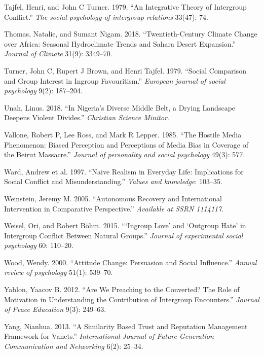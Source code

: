 \documentclass[11pt]{article}
\begin{document}
\leavevmode\hypertarget{ref-tajfel1979integrative}{}%
Tajfel, Henri, and John C Turner. 1979. ``An Integrative Theory of
Intergroup Conflict.'' \emph{The social psychology of intergroup
relations} 33(47): 74.

\leavevmode\hypertarget{ref-thomas2018sahara}{}%
Thomas, Natalie, and Sumant Nigam. 2018. ``Twentieth-Century Climate
Change over Africa: Seasonal Hydroclimate Trends and Sahara Desert
Expansion.'' \emph{Journal of Climate} 31(9): 3349--70.

\leavevmode\hypertarget{ref-turner1979social}{}%
Turner, John C, Rupert J Brown, and Henri Tajfel. 1979. ``Social
Comparison and Group Interest in Ingroup Favouritism.'' \emph{European
journal of social psychology} 9(2): 187--204.

\leavevmode\hypertarget{ref-unah2018nigeria}{}%
Unah, Linus. 2018. ``In Nigeria's Diverse Middle Belt, a Drying
Landscape Deepens Violent Divides.'' \emph{Christian Science Minitor}.

\leavevmode\hypertarget{ref-vallone1985hostileMedia}{}%
Vallone, Robert P, Lee Ross, and Mark R Lepper. 1985. ``The Hostile
Media Phenomenon: Biased Perception and Perceptions of Media Bias in
Coverage of the Beirut Massacre.'' \emph{Journal of personality and
social psychology} 49(3): 577.

\leavevmode\hypertarget{ref-ward1997naive}{}%
Ward, Andrew et al. 1997. ``Naive Realism in Everyday Life: Implications
for Social Conflict and Misunderstanding.'' \emph{Values and knowledge}:
103--35.

\leavevmode\hypertarget{ref-weinstein2005autonomous}{}%
Weinstein, Jeremy M. 2005. ``Autonomous Recovery and International
Intervention in Comparative Perspective.'' \emph{Available at SSRN
1114117}.

\leavevmode\hypertarget{ref-weisel2015ingroup}{}%
Weisel, Ori, and Robert Böhm. 2015. ```Ingroup Love' and `Outgroup Hate'
in Intergroup Conflict Between Natural Groups.'' \emph{Journal of
experimental social psychology} 60: 110--20.

\leavevmode\hypertarget{ref-wood2000attitude}{}%
Wood, Wendy. 2000. ``Attitude Change: Persuasion and Social Influence.''
\emph{Annual review of psychology} 51(1): 539--70.

\leavevmode\hypertarget{ref-yablon2012we}{}%
Yablon, Yaacov B. 2012. ``Are We Preaching to the Converted? The Role of
Motivation in Understanding the Contribution of Intergroup Encounters.''
\emph{Journal of Peace Education} 9(3): 249--63.

\leavevmode\hypertarget{ref-yang2013similarity}{}%
Yang, Nianhua. 2013. ``A Similarity Based Trust and Reputation
Management Framework for Vanets.'' \emph{International Journal of Future
Generation Communication and Networking} 6(2): 25--34.
\end{document}
